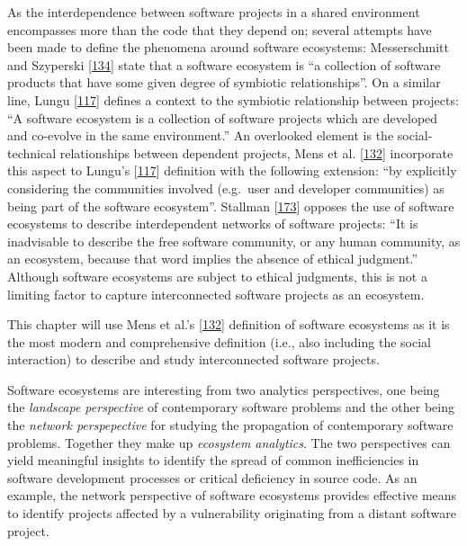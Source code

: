 \documentclass[]{book}
\begin{document}
As the interdependence between software projects in a shared environment
encompasses more than the code that they depend on; several attempts
have been made to define the phenomena around software ecosystems:
Messerschmitt and Szyperski
{[}\protect\hyperlink{ref-Messerschmitt2003}{134}{]} state that a
software ecosystem is ``a collection of software products that have some
given degree of symbiotic relationships''. On a similar line, Lungu
{[}\protect\hyperlink{ref-Lungu2009}{117}{]} defines a context to the
symbiotic relationship between projects: ``A software ecosystem is a
collection of software projects which are developed and co-evolve in the
same environment.'' An overlooked element is the social-technical
relationships between dependent projects, Mens et al.
{[}\protect\hyperlink{ref-Mens2013}{132}{]} incorporate this aspect to
Lungu's {[}\protect\hyperlink{ref-Lungu2009}{117}{]} definition with the
following extension: ``by explicitly considering the communities
involved (e.g.~user and developer communities) as being part of the
software ecosystem''. Stallman
{[}\protect\hyperlink{ref-Stallman2002}{173}{]} opposes the use of
software ecosystems to describe interdependent networks of software
projects: ``It is inadvisable to describe the free software community,
or any human community, as an ecosystem, because that word implies the
absence of ethical judgment.'' Although software ecosystems are subject
to ethical judgments, this is not a limiting factor to capture
interconnected software projects as an ecosystem.

This chapter will use Mens et al.'s
{[}\protect\hyperlink{ref-Mens2013}{132}{]} definition of software
ecosystems as it is the most modern and comprehensive definition (i.e.,
also including the social interaction) to describe and study
interconnected software projects.

Software ecosystems are interesting from two analytics perspectives, one
being the \emph{landscape perspective} of contemporary software problems
and the other being the \emph{network perspepective} for studying the
propagation of contemporary software problems. Together they make up
\emph{ecosystem analytics}. The two perspectives can yield meaningful
insights to identify the spread of common inefficiencies in software
development processes or critical deficiency in source code. As an
example, the network perspective of software ecosystems provides
effective means to identify projects affected by a vulnerability
originating from a distant software project.
\end{document}
